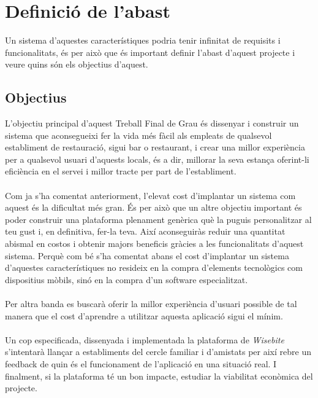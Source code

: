 
\chapter{Definició de l'abast} %

\label{Chapter3} %

Un sistema d'aquestes característiques podria tenir infinitat de requisits i funcionalitats, és per això que és important definir l'abast d'aquest projecte i veure quins són els objectius d'aquest.


\section{Objectius}

L'objectiu principal d'aquest Treball Final de Grau és dissenyar i construir un sistema que aconsegueixi fer la vida més fàcil als empleats de qualsevol establiment de restauració, sigui bar o restaurant, i crear una millor experiència per a qualsevol usuari d'aquests locals, és a dir, millorar la seva estança oferint-li eficiència en el servei i millor tracte per part de l'establiment.
\\\\
Com ja s'ha comentat anteriorment, l'elevat cost d'implantar un sistema com aquest és la dificultat més gran. És per això que un altre objectiu important és poder construir una plataforma plenament genèrica què la puguis personalitzar al teu gust i, en definitiva, fer-la teva. Així aconseguiràs reduir una quantitat abismal en costos i obtenir majors beneficis gràcies a les funcionalitats d'aquest sistema. Perquè com bé s'ha comentat abans el cost d'implantar un sistema d'aquestes característiques no resideix en la compra d'elements tecnològics com dispositius mòbils, sinó en la compra d'un software especialitzat.
\\\\
Per altra banda es buscarà oferir la millor experiència d'usuari possible de tal manera que el cost d'aprendre a utilitzar aquesta aplicació sigui el mínim.
\\\\
Un cop especificada, dissenyada i implementada la plataforma de \textit{Wisebite} s'intentarà llançar a establiments del cercle familiar i d'amistats per així rebre un feedback de quin és el funcionament de l'aplicació en una situació real. I finalment, si la plataforma té un bon impacte, estudiar la viabilitat econòmica del projecte.

